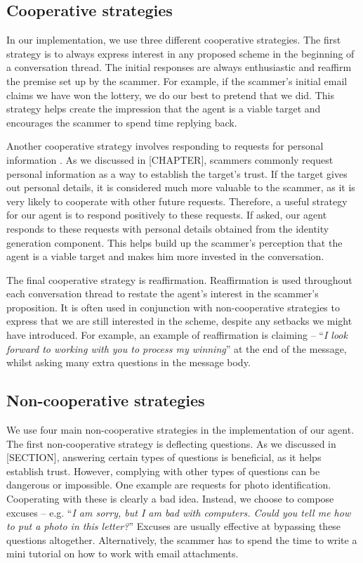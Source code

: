 \subsection{Cooperative strategies}
In our implementation, we use three different cooperative strategies. The first strategy is to always express interest in any proposed scheme in the beginning of a conversation thread. The initial responses are always enthusiastic and reaffirm the premise set up by the scammer. For example, if the scammer's initial email claims we have won the lottery, we do our best to pretend that we did. This strategy helps create the impression that the agent is a viable target and encourages the scammer to spend time replying back.

Another cooperative strategy involves responding to requests for personal information . As we discussed in [CHAPTER], scammers commonly request personal information as a way to establish the target's trust. If the target gives out personal details, it is considered much more valuable to the scammer, as it is very likely to cooperate with other future requests. Therefore, a useful strategy for our agent is to respond positively to these requests. If asked, our agent responds to these requests with personal details obtained from the identity generation component. This helps build up the scammer's perception that the agent is a viable target and makes him more invested in the conversation.

The final cooperative strategy is reaffirmation. Reaffirmation is used throughout each conversation thread to restate the agent's interest in the scammer's proposition. It is often used in conjunction with non-cooperative strategies to express that we are still interested in the scheme, despite any setbacks we might have introduced. For example, an example of reaffirmation is claiming -- ``\textit{I look forward to working with you to process my winning}'' at the end of the message, whilst asking many extra questions in the message body.

\subsection{Non-cooperative strategies}
We use four main non-cooperative strategies in the implementation of our agent. The first non-cooperative strategy is deflecting questions. As we discussed in [SECTION], answering certain types of questions is beneficial, as it helps establish trust. However, complying with other types of questions can be dangerous or impossible. One example are requests for photo identification. Cooperating with these is clearly a bad idea. Instead, we choose to compose excuses -- e.g. ``\textit{I am sorry, but I am bad with computers. Could you tell me how to put a photo in this letter?}'' Excuses are usually effective at bypassing these questions altogether. Alternatively, the scammer has to spend the time to write a mini tutorial on how to work with email attachments. 

